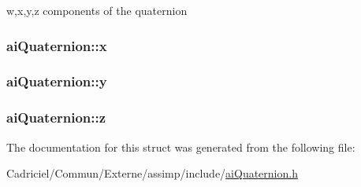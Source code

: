 w,x,y,z components of the quaternion 

\hypertarget{structai_quaternion_af9db21b086c14d8654d62005f740e75f}{
\subsubsection[{x}]{ ai\-Quaternion\-::x}}\label{structai_quaternion_af9db21b086c14d8654d62005f740e75f}
\hypertarget{structai_quaternion_a1695fefbc60becf95fcafcc08573ab44}{
\subsubsection[{y}]{ ai\-Quaternion\-::y}}\label{structai_quaternion_a1695fefbc60becf95fcafcc08573ab44}
\hypertarget{structai_quaternion_acc30da6103d5131fb1bed6640f1eeda0}{
\subsubsection[{z}]{ ai\-Quaternion\-::z}}\label{structai_quaternion_acc30da6103d5131fb1bed6640f1eeda0}


The documentation for this struct was generated from the following file\-:\begin{DoxyCompactItemize}
\item 
Cadriciel/\-Commun/\-Externe/assimp/include/\hyperlink{ai_quaternion_8h}{ai\-Quaternion.\-h}\end{DoxyCompactItemize}
